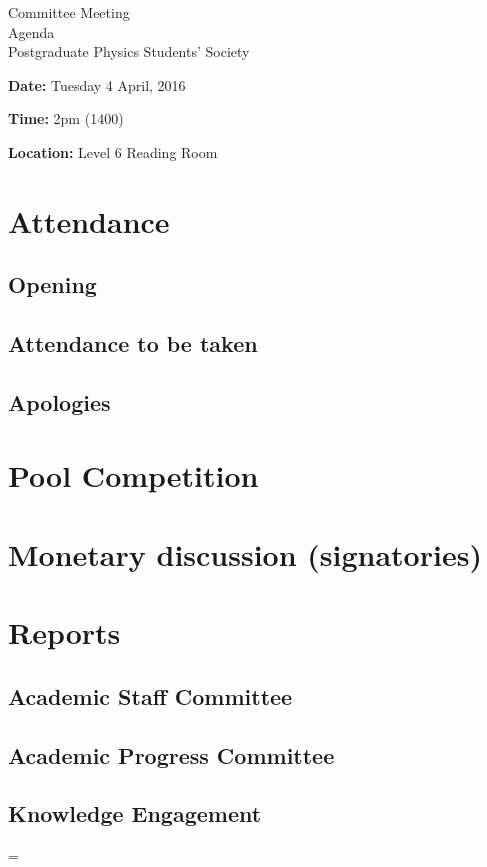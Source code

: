 \documentclass[a4paper,11pt]{article}
\newenvironment{absolutelynopagebreak}
  {\par\nobreak\vfil\penalty0\vfilneg
   \vtop\bgroup}
  {\par\xdef\tpd{\the\prevdepth}\egroup
   \prevdepth=\tpd}
\begin{document}
\begin{absolutelynopagebreak}
    \begin{center}
		\Huge Committee Meeting\\
		\huge Agenda\\
		\Huge Postgraduate Physics Students' Society\\[0.5cm]
		\large
        \raggedright \textbf{Date:} Tuesday 4 April, 2016\\
        \raggedright \textbf{Time:} 2pm (1400)\\
        \raggedright \textbf{Location:} Level 6 Reading Room\\[0.5cm]
    \end{center}
\section{Attendance}
\subsection{Opening}
\subsection{Attendance to be taken}
\subsection{Apologies}

\section{Pool Competition}

\section{Monetary discussion (signatories)}

\section{Reports}
\subsection{Academic Staff Committee}
\subsection{Academic Progress Committee}
\subsection{Knowledge Engagement}

\end{absolutelynopagebreak}
\end{document}
